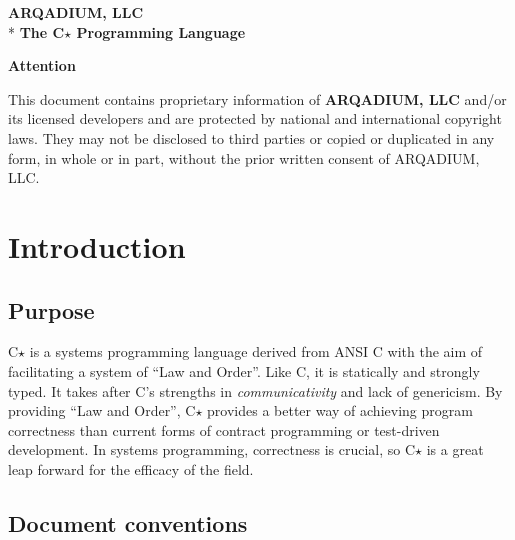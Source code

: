 \documentclass[12pt,english]{article}
\begin{document}
\begin{center}

\vspace*{9cm}

\Large{\textbf{ARQADIUM, LLC}} \\*
\vspace*{0.25cm}
\Huge{\textbf{The C$\star$ Programming Language}}
\end{center}

\clearpage{}

\thispagestyle{empty}

\vspace*{3cm}

\begin{center}
\LARGE{\textbf{Attention}}
\end{center}

\vspace*{1.5cm}

This document contains proprietary information of \textbf{ARQADIUM, LLC}
and/or its licensed developers and are protected by national and international
copyright laws. They may not be disclosed to third parties or copied or
duplicated in any form, in whole or in part, without the prior written consent
of ARQADIUM, LLC.

\clearpage{}

\tableofcontents{}

\clearpage{}

\section{Introduction}
\label{s-introduction}

\subsection{Purpose}
\label{s-introduction-purpose}

C$\star$ is a systems programming language derived from ANSI C with the aim of
facilitating a system of ``Law and Order''. Like C, it is statically and
strongly typed. It takes after C's strengths in \textit{communicativity} and
lack of genericism. By providing ``Law and Order'', C$\star$ provides a better
way of achieving program correctness than current forms of contract
programming or test-driven development. In systems programming, correctness is
crucial, so C$\star$ is a great leap forward for the efficacy of the field.

\subsection{Document conventions}
\label{s-introduction-document_conventions}
\end{document}
